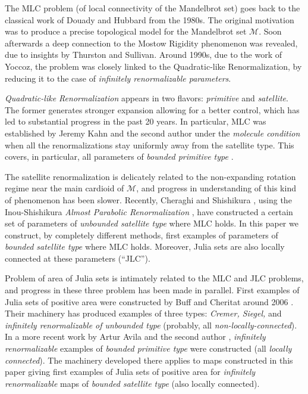 \documentclass{amsart}
\newcommand{\1}{{\mathbb 1 }}
\newcommand{\Mandel}{{\mathcal{M}}}
\theoremstyle{remark}
\numberwithin{equation}{section}
\theoremstyle{definition}
\theoremstyle{nonumberbreak}
\begin{document}
The MLC problem (of local connectivity of the Mandelbrot set) goes back to the classical work 
of Douady and Hubbard from the 1980s. The original motivation was to produce a precise topological model for 
the Mandelbrot set $\Mandel$. Soon afterwards a deep connection to the Mostow Rigidity phenomenon was revealed, due to insights by Thurston and Sullivan.  
Around 1990s, due to the work of Yoccoz, the problem was closely linked to 
the Quadratic-like Renormalization, 
by reducing it to the case of  {\em infinitely renormalizable parameters}. 

{\em Quadratic-like Renormalization} appears in two flavors:
{\em primitive}  and {\em satellite}. 
The former generates stronger  expansion allowing for  a better control,
which has led to substantial progress in the past 20 years. 
In particular, MLC was established by Jeremy Kahn 
and the second author \cite{L:acta,KL1,KL2}
under the {\em molecule condition} when all the renormalizations
stay  uniformly away from the satellite type. 
This covers, in particular,  all parameters of {\em bounded primitive type}
\cite{K}.   

The satellite renormalization  is delicately related to the 
non-expanding rotation regime
near the main cardioid of $\Mandel$, and progress in 
understanding of this kind of phenomenon has been slower. 
Recently, Cheraghi and Shishikura \cite{CS},
using the Inou-Shishikura {\em  Almost Parabolic Renormalization}  \cite{IS},  
have constructed a certain set of parameters of {\em unbounded satellite type} where
MLC holds. In this paper we construct, by completely different methods,  first examples of  parameters of 
{\em bounded satellite type} where MLC holds.    
Moreover,  Julia sets are also locally connected at these parameters (``JLC'').

 Problem of area of Julia sets is intimately related to the MLC and JLC problems,
and progress in these three problem has been made in parallel. 
First examples of Julia sets of
positive area were constructed by Buff and Cheritat around 2006 \cite{BC}. 
Their machinery  has produced  examples of three types: 
{\em Cremer, Siegel,} and  {\em infinitely renormalizable of unbounded type}
(probably, all {\em non-locally-connected}).
In a more recent  work by Artur Avila and the second author \cite{AL-posmeas}, 
 {\em infinitely renormalizable } examples of {\em bounded primitive type}
were constructed (all {\em locally connected}). The machinery developed there applies to  maps constructed in this paper
giving first examples of Julia sets of positive area for 
 {\em infinitely renormalizable } maps of {\em bounded satellite type}
 (also locally connected).
 
\end{document}
